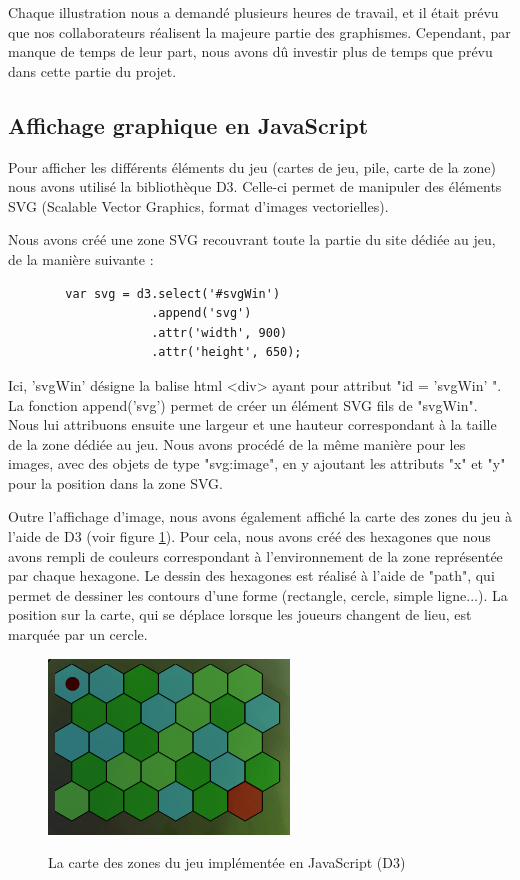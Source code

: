 \documentclass[12pt]{report}
\begin{document}
        Chaque illustration nous a demandé plusieurs heures de travail, et il était prévu que nos collaborateurs réalisent la majeure partie des graphismes. Cependant, par manque de temps de leur part, nous avons dû investir plus de temps que prévu dans cette partie du projet.


        \subsection{Affichage graphique en JavaScript}

        Pour afficher les différents éléments du jeu (cartes de jeu, pile, carte de la zone) nous avons utilisé la bibliothèque D3. Celle-ci permet de manipuler des éléments SVG (Scalable Vector Graphics, format d'images vectorielles).

        Nous avons créé une zone SVG recouvrant toute la partie du site dédiée au jeu, de la manière suivante :

        \begin{verbatim}
        var svg = d3.select('#svgWin')
                    .append('svg')
                    .attr('width', 900)
                    .attr('height', 650);
        \end{verbatim}

        Ici, 'svgWin' désigne la balise html <div> ayant pour attribut "id = 'svgWin' ". La fonction append('svg') permet de créer un élément SVG fils de "svgWin". Nous lui attribuons ensuite une largeur et une hauteur correspondant à la taille de la zone dédiée au jeu. Nous avons procédé de la même manière pour les images, avec des objets de type "svg:image", en y ajoutant les attributs "x" et "y" pour la position dans la zone SVG.

        Outre l'affichage d'image, nous avons également affiché la carte des zones du jeu à l'aide de D3 (voir figure \ref{fig:map}). Pour cela, nous avons créé des hexagones que nous avons rempli de couleurs correspondant à l'environnement de la zone représentée par chaque hexagone. Le dessin des hexagones est réalisé à l'aide de "path", qui permet de dessiner les contours d'une forme (rectangle, cercle, simple ligne...). La position sur la carte, qui se déplace lorsque les joueurs changent de lieu, est marquée par un cercle.

		\begin{figure}[h!]
			\centering
			\includegraphics[scale=0.95]{map}
			\label{fig:map}
			\caption{La carte des zones du jeu implémentée en JavaScript (D3)}
		\end{figure}
\end{document}
